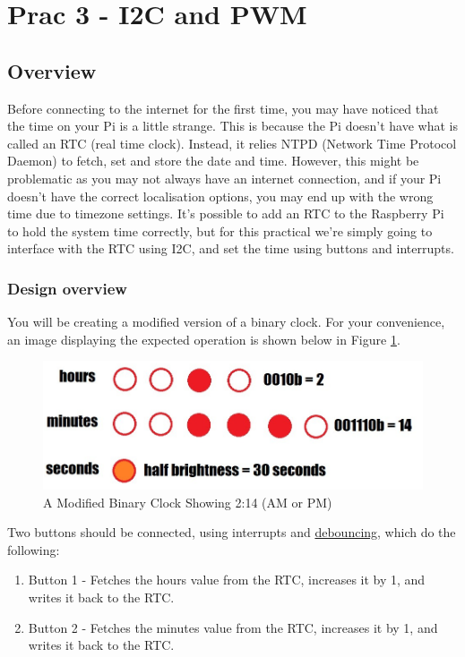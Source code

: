 \newpage
\section{Prac 3 - I2C and PWM}
\label{sec:Prac3}
\subsection{Overview}
Before connecting to the internet for the first time, you may have noticed that the time on your Pi is a little strange. This is because the Pi doesn't have what is called an RTC (real time clock). Instead, it relies NTPD (Network Time Protocol Daemon) to fetch, set and store the date and time. However, this might be problematic as you may not always have an internet connection, and if your Pi doesn't have the correct localisation options, you may end up with the wrong time due to timezone settings. It's possible to add an RTC to the Raspberry Pi to hold the system time correctly, but for this practical we're simply going to interface with the RTC using I2C, and set the time using buttons and interrupts.

\subsubsection{Design overview}
You will be creating a modified version of a binary clock. For your convenience, an image displaying the expected operation is shown below in Figure \ref{fig:BinaryClock}.
\begin{figure}[H]
\centering
\includegraphics[width=0.6\columnwidth]{Figures/prac3clock}
\caption{A Modified Binary Clock Showing 2:14 (AM or PM)}
\label{fig:BinaryClock}
\end{figure}

Two buttons should be connected, using interrupts and \href{https://raspberrypi.stackexchange.com/questions/8544/gpio-interrupt-debounce}{debouncing}, which do the following:
\begin{enumerate}
    \item Button 1 - Fetches the hours value from the RTC, increases it by 1, and writes it back to the RTC.
    \item Button 2 - Fetches the minutes value from the RTC, increases it by 1, and writes it back to the RTC.
\end{enumerate}

